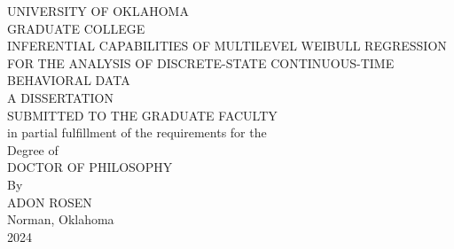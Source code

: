 \documentclass[12pt]{./styles/outhesis}
\begin{document}
\begin{center}
\thispagestyle{empty}
UNIVERSITY OF OKLAHOMA\\
\vspace{0.2cm}
GRADUATE COLLEGE\\
\vspace{2.5cm}
INFERENTIAL CAPABILITIES OF MULTILEVEL WEIBULL REGRESSION
\vspace{0.2cm}
FOR THE ANALYSIS OF DISCRETE-STATE CONTINUOUS-TIME BEHAVIORAL DATA\\
\vspace{3.5cm}
A DISSERTATION\\
SUBMITTED TO THE GRADUATE FACULTY\\
\vspace{0.2cm}
in partial fulfillment of the requirements for the\\
\vspace{0.2cm}
Degree of\\
\vspace{0.2cm}
DOCTOR OF PHILOSOPHY\\
\vspace{2.5cm}
By\\
\vspace{0.4cm}
\singlespace
ADON ROSEN\\
Norman, Oklahoma\\
2024
\end{center}
\end{document}
